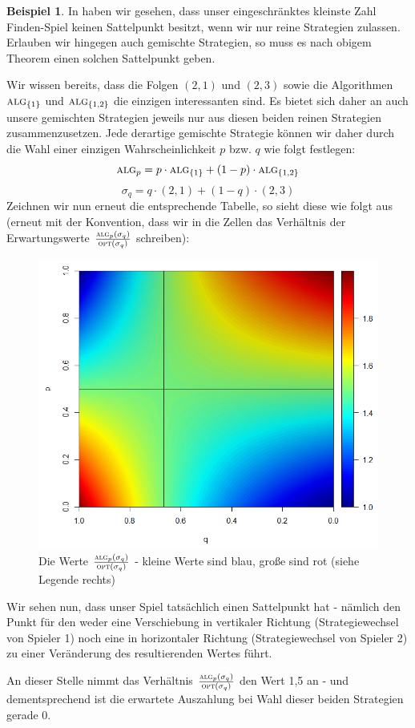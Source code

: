 \documentclass[a4paper,ngerman,12pt,bibtotoc]{scrartcl}
\theoremstyle{definition}
\newtheorem{bsp}[defn]{Beispiel}
\theoremstyle{plain}
\theoremstyle{remark}
\renewcommand{\_}{\mathpunct{.}\,}
\newcommand{\?}{\,{:}\,}
\newcommand{\Alg}{\ensuremath{\textsc{alg}}}
\newcommand{\Opt}{\ensuremath{\textsc{opt}}}
\begin{document}
	\begin{bsp}
		In  haben wir gesehen, dass unser eingeschränktes \glqq kleinste Zahl Finden\grqq{}-Spiel keinen Sattelpunkt besitzt, wenn wir nur reine Strategien zulassen. Erlauben wir hingegen auch gemischte Strategien, so muss es nach obigem Theorem einen solchen Sattelpunkt geben.
		
		Wir wissen bereits, dass die Folgen $(2,1)$ und $(2,3)$ sowie die Algorithmen $\Alg_{\{1\}}$ und $\Alg_{\{1,2\}}$ die einzigen \glqq interessanten\grqq{} sind. Es bietet sich daher an auch unsere gemischten Strategien jeweils nur aus diesen beiden reinen Strategien zusammenzusetzen. Jede derartige gemischte Strategie können wir daher durch die Wahl einer einzigen Wahrscheinlichkeit $p$ bzw. $q$ wie folgt festlegen:
			\[\Alg_p = p\cdot\Alg_{\{1\}} + (1-p)\cdot\Alg_{\{1,2\}}\]
			\[\sigma_q = q\cdot(2,1) + (1-q)\cdot(2,3)\]
		Zeichnen wir nun erneut die entsprechende \glqq Tabelle\grqq{}, so sieht diese wie folgt aus (erneut mit der Konvention, dass wir in die Zellen das Verhältnis der Erwartungswerte $\frac{\Alg_p(\sigma_q)}{\Opt(\sigma_q)}$ schreiben):
		
			\begin{figure}[h]
				\centering
				\includegraphics[width=0.35\linewidth]{../Bilder/Sattelpunkt}
				\caption{\small Die Werte $\frac{\Alg_p(\sigma_q)}{\Opt(\sigma_q)}$ - kleine Werte sind blau, große sind rot (siehe Legende rechts)}
				\label{fig:Sattelpunkt}
			\end{figure}
			
		Wir \glqq sehen\grqq{} nun, dass unser Spiel tatsächlich einen Sattelpunkt hat - nämlich den Punkt für den weder eine Verschiebung in vertikaler Richtung (Strategiewechsel von Spieler 1) noch eine in horizontaler Richtung (Strategiewechsel von Spieler 2) zu einer Veränderung des resultierenden Wertes führt.
		
		An dieser Stelle nimmt das Verhältnis $\frac{\Alg_p(\sigma_q)}{\Opt(\sigma_q)}$ den Wert 1,5 an - und dementsprechend ist die erwartete Auszahlung bei Wahl dieser beiden Strategien gerade 0. 
		

\end{bsp}
\end{document}
